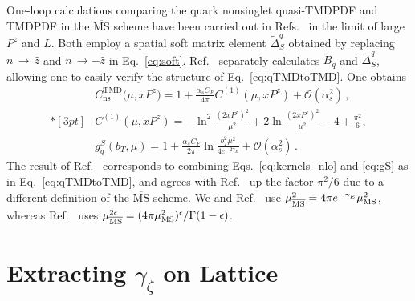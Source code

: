 \documentclass[prd,aps,twocolumn,bibnotes,nofootinbib,preprintnumbers,floatfix]{revtex4-1}
\DeclareRobustCommand{\eq}[1]{Eq.~\eqref{eq:#1}}
\DeclareRobustCommand{\eqs}[2]{Eqs.~\eqref{eq:#1} and \eqref{eq:#2}}
\DeclareRobustCommand{\mycite}[1]{Ref.~\cite{#1}}
\DeclareRobustCommand{\mycites}[1]{Refs.~\cite{#1}}
\newcommand{\eps}{\epsilon}
\newcommand{\cO}{\mathcal{O}}
\newcommand{\nn}{\nonumber}
\newcommand{\bn}{{\bar{n}}}
\newcommand{\as}{\alpha_s}
\newcommand{\MS}{\overline{\mathrm{MS}}}
\newcommand{\ns}{{\text{ns}}}
\newcommand\TMD{\mathrm{TMD}}
\begin{document}
One-loop calculations comparing the quark nonsinglet quasi-TMDPDF and TMDPDF in the $\MS$ scheme have been carried out in \mycites{Ji:2018hvs,Ebert:2019okf} in the limit of large $P^z$ and $L$.
Both employ a spatial soft matrix element $\tilde\Delta_S^q$ obtained by replacing $n\,{\to}\,\hat z$ and $\bn\,{\to}-\!\hat z$ in \eq{soft}.
\mycite{Ebert:2019okf} separately calculates $\tilde B_q$ and $\tilde\Delta_S^q$, allowing one to easily verify the structure of \eq{qTMDtoTMD}.
One obtains
\begin{align} \label{eq:kernels_nlo}
 &C^\TMD_\ns\bigl(\mu, x P^z\bigr)
  = 1 + \frac{\as C_F}{4\pi} C^{(1)}(\mu, x P^z) + \cO(\as^2)
\,,\!\!\\*[3pt] \nn
 &C^{(1)}(\mu, x P^z) = - \ln^2\frac{(2 x P^z)^2}{\mu^2} + 2 \ln\frac{(2 x P^z)^2}{\mu^2}
 - 4 + \frac{\pi^2}{6},
 \\ 
\label{eq:gS}
 &g^S_q(b_T,\mu) = 1 + \frac{\as C_F}{2\pi} \ln\frac{b_T^2 \mu^2}{4 e^{-2\gamma_E}} + \cO(\as^2)
\,.\end{align}
The result of \mycite{Ji:2018hvs} corresponds to combining \eqs{kernels_nlo}{gS} as in \eq{qTMDtoTMD},
and agrees with \mycite{Ebert:2019okf} up the factor $\pi^2/6$ due to a different definition of the $\MS$ scheme.
We and \mycite{Ebert:2019okf} use $\mu^2_{\MS} = 4\pi e^{-\gamma_E} \mu^2_{\rm MS}$, whereas \mycite{Ji:2018hvs} uses $\mu^{2\eps}_{\MS} = (4\pi \mu^2_{\rm MS})^\eps / \Gamma(1-\eps)$.


\section{\texorpdfstring{\boldmath Extracting $\gamma_\zeta$ on Lattice}{Extracting gammazeta on Lattice}}
\label{sec:gamma_zeta}
\end{document}
